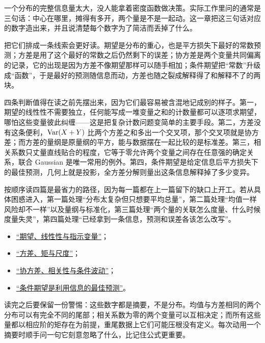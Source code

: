 一个分布的完整信息量太大，没人能拿着密度函数做决策。实际工作里问的通常是三句话：中心在哪里，摊得有多开，两个量是不是一起动。这一章把这三句话对应的数字造出来，并且说清楚每个数字为了简洁而丢掉了什么。

把它们排成一条线索会更好读。期望是分布的重心，也是平方损失下最好的常数预测；方差是用了这个最好的常数之后仍然剩下的误差；协方差是两个变量共同偏离的记录，它的出现是因为方差不像期望那样可以随手相加；条件期望把``常数''升级成``函数''，于是最好的预测随信息而动，方差也随之裂成解释得了和解释不了的两块。

四条判断值得在读之前先摆出来，因为它们最容易被含混地记成别的样子。第一，期望的线性性不需要独立，任何能写成一堆变量之和的计数量都可以逐项求期望，哪怕这些变量彼此纠缠——这是把复杂计数问题变简单的主要手段。第二，方差没有这条便利，\(\operatorname{Var}(X+Y)\) 比两个方差之和多出一个交叉项，那个交叉项就是协方差；而方差的量纲是原量纲的平方，能与数据摆在一起比较的是标准差。第三，相关系数只丈量直线贴合的程度，它等于零允许两个变量之间存在任意强的确定关系，联合 Gaussian 是唯一常用的例外。第四，条件期望是给定信息后平方损失下的最佳预测，几何上就是投影，全方差分解则量出这条信息解释掉了多少变异。

按顺序读四篇是最省力的路径，因为每一篇都在上一篇留下的缺口上开工。若从具体困惑进入，第一篇处理``分布太复杂但只想要平均总量''，第二篇处理``均值一样风险却不一样''以及量纲与标准化，第三篇处理``两个量的关联怎么度量、什么时候度量失灵''，第四篇处理``已经拿到一条信息，预测和误差各该怎么改写''。

\begin{itemize}
\tightlist
\item \hyperref[sec:05-Probability/04-Expectation-and-Moments/01]{``期望、线性性与指示变量''}；
\item \hyperref[sec:05-Probability/04-Expectation-and-Moments/02]{``方差、矩与尺度''}；
\item \hyperref[sec:05-Probability/04-Expectation-and-Moments/03]{``协方差、相关性与条件波动''}；
\item \hyperref[sec:05-Probability/04-Expectation-and-Moments/04]{``条件期望是利用信息的最佳预测''}。
\end{itemize}

读完之后要保留一份警惕：这些数字都是摘要，不是分布。均值与方差相同的两个分布可以有完全不同的尾部；相关系数为零的两个变量可以互相决定；而所有这些量都以相应阶的矩存在为前提，重尾数据上它们可能压根没有定义。每次动用一个摘要时顺手问一句它刻意忽略了什么，比记住公式更重要。
